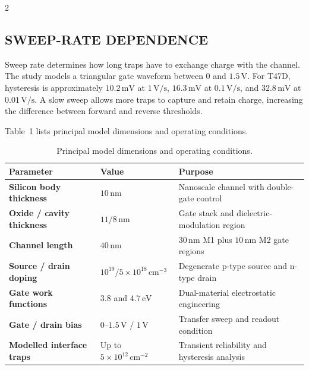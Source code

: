 \begin{multicols}{2}
  \subsection*{\centering\uppercase{Sweep-Rate Dependence}}
  Sweep rate determines how long traps have to exchange charge with the channel. The study models a triangular gate waveform between $0$ and $1.5\,\mathrm{V}$. For T47D, hysteresis is approximately $10.2\,\mathrm{mV}$ at $1\,\mathrm{V/s}$, $16.3\,\mathrm{mV}$ at $0.1\,\mathrm{V/s}$, and $32.8\,\mathrm{mV}$ at $0.01\,\mathrm{V/s}$. A slow sweep allows more traps to capture and retain charge, increasing the difference between forward and reverse thresholds.

  Table~1 lists principal model dimensions and operating conditions.
\end{multicols}

\begin{table}[!b]
\centering
\caption{Principal model dimensions and operating conditions.}
\small
  \setlength{\tabcolsep}{6pt}
  \renewcommand{\arraystretch}{1.5}
  \begin{tabular}{@{}>{\bfseries\RaggedRight\arraybackslash}p{}
                      >{\Centering\arraybackslash}p{}
                      >{\RaggedRight\arraybackslash}p{}@{}}
    \toprule
    \textbf{Parameter} & \textbf{Value} & \textbf{Purpose} \\
    \midrule
    Silicon body thickness & $10\,\mathrm{nm}$ & Nanoscale channel with double-gate control \\
    Oxide / cavity thickness & $11/8\,\mathrm{nm}$ & Gate stack and dielectric-modulation region \\
    Channel length & $40\,\mathrm{nm}$ & $30\,\mathrm{nm}$ M1 plus $10\,\mathrm{nm}$ M2 gate regions \\
    Source / drain doping & $10^{19}/5\times10^{18}\,\mathrm{cm}^{-3}$ & Degenerate p-type source and n-type drain \\
    Gate work functions & $3.8$ and $4.7\,\mathrm{eV}$ & Dual-material electrostatic engineering \\
    Gate / drain bias & $0$--$1.5\,\mathrm{V}$ / $1\,\mathrm{V}$ & Transfer sweep and readout condition \\
    Modelled interface traps & Up to $5\times10^{12}\,\mathrm{cm}^{-2}$ & Transient reliability and hysteresis analysis \\
    \bottomrule
  \end{tabular}
\end{table}

